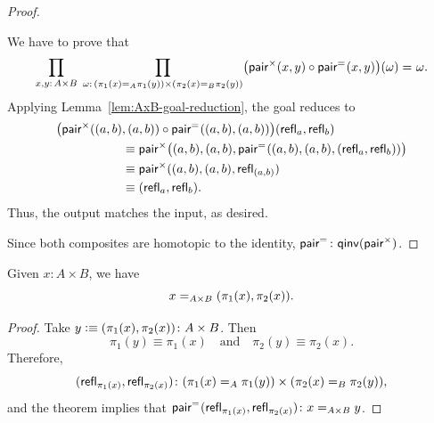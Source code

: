 \begin{proof}
\begin{enumerate}[a),font=\upshape]
        We have to prove that
        \[
            \prod_{x,y\colon A\times B}\;
            \prod_{\omega\colon(\pi_1(x)\eq A\pi_1(y))\times (\pi_2(x)\eq B\pi_2(y))}
                \bigl(\fun{pair}^\times(x,y)\circ\fun{pair}^{\eq{}}(x,y)\bigr)(\omega)
                \eq{}\omega.
        \]
        Applying Lemma~\ref{lem:AxB-goal-reduction}, the goal reduces to
        \begin{align*}
            \bigl(\mathsf{pair}^\times((a,b)&,(a,b))\circ\mathsf{pair}^{\mathrel{=_{}}}((a,b),(a,b))\bigr)
            (\mathsf{refl}_a,\mathsf{refl}_b)\\
                &\equiv\mathsf{pair}^\times\bigl((a,b),(a,b),
                   \mathsf{pair}^{\mathrel{=_{}}}((a,b),(a,b),(\mathsf{refl}_a,\mathsf{refl}_b))
                    \bigr)\\
                &\equiv\mathsf{pair}^\times((a,b),(a,b),\mathsf{refl}_{(a,b)})\\
                &\equiv(\mathsf{refl}_a,\mathsf{refl}_b).
        \end{align*}
        Thus, the output matches the input, as desired.
    \end{enumerate}
    Since both composites are homotopic to the identity, $\fun{pair}^{\eq{}}\colon\fun{qinv}(\fun{pair}^\times)$.
    
\end{proof}

\begin{cor}\label{cor:cartesian-uniqueness}
    Given $x\colon A\times B$, we have
    \[
        x\mathrel{=_{A\times B}}(\pi_1(x),\pi_2(x)).
    \]
\end{cor}

\begin{proof}
    Take $y\defeq(\pi_1(x),\pi_2(x))\colon A\times B$. Then
    \[
        \pi_1(y)\equiv\pi_1(x)
        \quad\text{and}\quad
        \pi_2(y)\equiv\pi_2(x).
    \]
    Therefore,
    \[
        (\fun{refl}_{\pi_1(x)},\fun{refl}_{\pi_2(x)})\colon
        (\pi_1(x)\eq A\pi_1(y))\times(\pi_2(x)\eq B\pi_2(y)),
    \]
    and the theorem implies that $\fun{pair}^{\eq{}}(\fun{refl}_{\pi_1(x)},\fun{refl}_{\pi_2(x)})\colon x\eq{A\times B}y$.
    
\end{proof}

